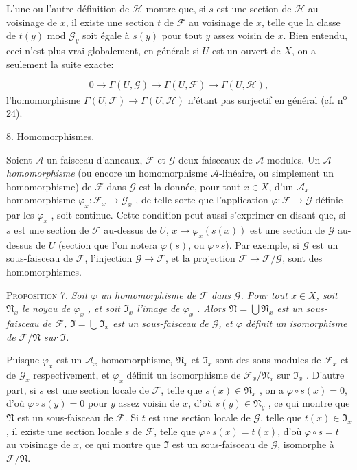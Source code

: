 L'une ou l'autre définition de $\mathcal{H}$ montre que, si $s$ est une section de $\mathcal{H}$ au voisinage de $x$, il existe une section $t$ de $\mathcal{F}$ au voisinage de $x$, telle que la classe de $t(y)$ mod $\mathcal{G}_y$ soit égale à $s(y)$ pour tout $y$ assez voisin de $x$. Bien entendu, ceci n'est plus vrai globalement, en général: si $U$ est un ouvert de $X$, on a seulement la suite exacte:

\begin{equation*}
0 \to \Gamma(U, \mathcal{G}) \to \Gamma(U, \mathcal{F}) \to \Gamma(U, \mathcal{H}),
\end{equation*}
l'homomorphisme $\Gamma(U, \mathcal{F}) \to \Gamma(U, \mathcal{H})$ n'étant pas surjectif en général (cf. n\textsuperscript{o} 24).


8. Homomorphismes.

Soient $\mathcal{A}$ un faisceau d'anneaux, $\mathcal{F}$ et $\mathcal{G}$ deux faisceaux de $\mathcal{A}$-modules. Un $\mathcal{A}$-\emph{homomorphisme} (ou encore un homomorphisme $\mathcal{A}$-linéaire, ou simplement un homomorphisme) de $\mathcal{F}$ dans $\mathcal{G}$ est la donnée, pour tout $x \in X$, d'un $\mathcal{A}_x$-homomorphisme $\varphi_x : \mathcal{F}_x \to \mathcal{G}_x$ , de telle sorte que l'application $\varphi : \mathcal{F} \to \mathcal{G}$ définie par les $\varphi_x$ , soit continue. Cette condition peut aussi s'exprimer en disant que, si $s$ est une section de $\mathcal{F}$ au-dessus de $U$, $x \to \varphi_x(s(x))$ est une section de $\mathcal{G}$ au-dessus de $U$ (section que l'on notera $\varphi(s)$, ou $\varphi \circ s$). Par exemple, si $\mathcal{G}$ est un sous-faisceau de $\mathcal{F}$, l'injection $\mathcal{G} \to \mathcal{F}$, et la projection $\mathcal{F} \to \mathcal{F}/\mathcal{G}$, sont des homomorphismes.

\textsc{Proposition} 7. \emph{Soit $\varphi$ un homomorphisme de $\mathcal{F}$ dans $\mathcal{G}$. Pour tout $x \in X$, soit $\mathfrak{N}_x$ le noyau de $\varphi_x$ , et soit $\mathfrak{I}_x$ l'image de $\varphi_x$ . Alors $\mathfrak{N} = \bigcup \mathfrak{N}_x$ est un sous-faisceau de $\mathcal{F}$, $\mathfrak{I} = \bigcup \mathfrak{I}_x$ est un sous-faisceau de $\mathcal{G}$, et $\varphi$ définit un isomorphisme de $\mathcal{F}/\mathfrak{N}$ sur $\mathfrak{I}$.}

Puisque $\varphi_x$ est un $\mathcal{A}_x$-homomorphisme, $\mathfrak{N}_x$ et $\mathfrak{I}_x$ sont des sous-modules de $\mathcal{F}_x$ et de $\mathcal{G}_x$ respectivement, et $\varphi_x$ définit un isomorphisme de $\mathcal{F}_x/\mathfrak{N}_x$ sur $\mathfrak{I}_x$ . D'autre part, si $s$ est une section locale de $\mathcal{F}$, telle que $s(x) \in \mathfrak{N}_x$ , on a $\varphi \circ s(x) = 0$, d'où $\varphi \circ s(y) = 0$ pour $y$ assez voisin de $x$, d'où $s(y) \in \mathfrak{N}_y$ , ce qui montre que $\mathfrak{N}$ est un sous-faisceau de $\mathcal{F}$. Si $t$ est une section locale de $\mathcal{G}$, telle que $t(x) \in \mathfrak{I}_x$ , il existe une section locale $s$ de $\mathcal{F}$, telle que $\varphi \circ s(x) = t(x)$, d'où $\varphi \circ s = t$ au voisinage de $x$, ce qui montre que $\mathfrak{I}$ est un sous-faisceau de $\mathcal{G}$, isomorphe à $\mathcal{F}/\mathfrak{N}$.

